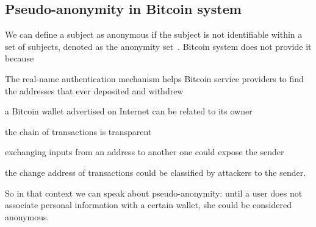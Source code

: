 \subsection{Pseudo-anonymity in Bitcoin system}
We can define a subject as anonymous if the subject is not identifiable
within a set of subjects, denoted as the anonymity 
set~\cite{terminology}. Bitcoin system does not provide it 
because~\cite{deanon}
\begin{enumerate*}[label=\roman*),itemjoin={,\quad}]
\item The real-name authentication mechanism helps Bitcoin service providers to
find the addresses that ever deposited and withdrew
\item a Bitcoin wallet advertised on Internet can be related to its owner
\item the chain of transactions is transparent
\item exchanging inputs from an address to another one could expose the sender
\item the change address of transactions could be classified by attackers to
the sender.
\end{enumerate*}
So in that context we can speak about pseudo-anonymity: until a user does not
associate personal information with a certain wallet, she could be considered
anonymous.
